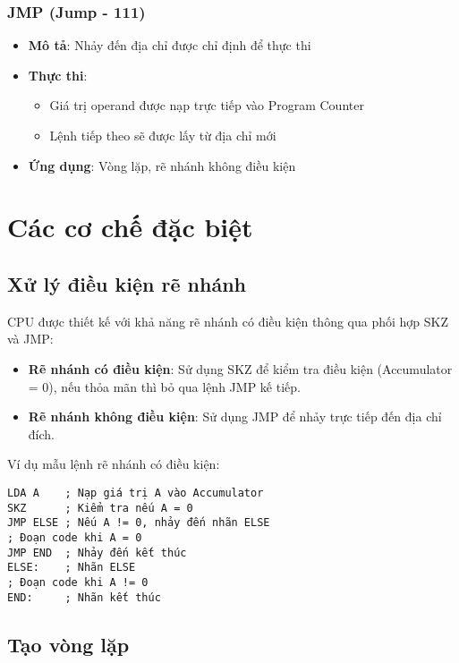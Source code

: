 \subsubsection{JMP (Jump - 111)}
\begin{itemize}
    \item \textbf{Mô tả}: Nhảy đến địa chỉ được chỉ định để thực thi
    \item \textbf{Thực thi}:
    \begin{itemize}
        \item Giá trị operand được nạp trực tiếp vào Program Counter
        \item Lệnh tiếp theo sẽ được lấy từ địa chỉ mới
    \end{itemize}
    \item \textbf{Ứng dụng}: Vòng lặp, rẽ nhánh không điều kiện
\end{itemize}

\section{Các cơ chế đặc biệt}

\subsection{Xử lý điều kiện rẽ nhánh}

CPU được thiết kế với khả năng rẽ nhánh có điều kiện thông qua phối hợp SKZ và JMP:

\begin{itemize}
    \item \textbf{Rẽ nhánh có điều kiện}: Sử dụng SKZ để kiểm tra điều kiện (Accumulator = 0), nếu thỏa mãn thì bỏ qua lệnh JMP kế tiếp.
    \item \textbf{Rẽ nhánh không điều kiện}: Sử dụng JMP để nhảy trực tiếp đến địa chỉ đích.
\end{itemize}

Ví dụ mẫu lệnh rẽ nhánh có điều kiện:
\begin{verbatim}
LDA A    ; Nạp giá trị A vào Accumulator
SKZ      ; Kiểm tra nếu A = 0
JMP ELSE ; Nếu A != 0, nhảy đến nhãn ELSE
; Đoạn code khi A = 0
JMP END  ; Nhảy đến kết thúc
ELSE:    ; Nhãn ELSE
; Đoạn code khi A != 0
END:     ; Nhãn kết thúc
\end{verbatim}

\subsection{Tạo vòng lặp}

